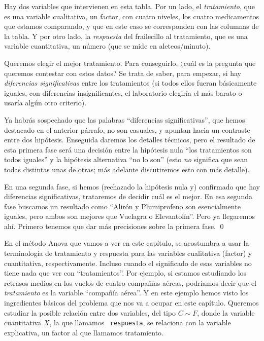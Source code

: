 \begin{ejemplo}
Hay dos variables que intervienen en esta tabla. Por un lado, el {\em tratamiento}, que es una
variable cualitativa, un factor, con cuatro niveles, los cuatro medicamentos que estamos
comparando, y que en este caso se corresponden con las columnas de la tabla. Y por otro lado, la
{\em respuesta} del frailecillo al tratamiento, que es una variable cuantitativa, un número (que se
mide en aleteos/minuto).

Queremos elegir el mejor tratamiento. Para conseguirlo,  ¿cuál es la pregunta que queremos
contestar con estos datos? Se trata de saber, para empezar, si hay {\em diferencias significativas}
entre los tratamientos (si todos ellos fueran básicamente iguales, con diferencias insignificantes,
el laboratorio elegiría el más barato o usaría algún otro criterio).

Ya habrás sospechado que las palabras ``diferencias significativas'', que hemos destacado en el
anterior párrafo, no son casuales, y apuntan hacia un contraste entre dos hipótesis. Enseguida
daremos los detalles técnicos, pero el resultado de esta primera fase será una decisión entre la
hipótesis nula ``los tratamientos son todos iguales'' y la hipótesis alternativa ``no lo son'' (esto {\em no} significa que sean todas distintas unas de otras; más adelante discutiremos esto con más detalle).

En una segunda fase, si hemos (rechazado la hipótesis nula y) confirmado que hay diferencias
significativas, trataremos de decidir cuál es el mejor. En esa segunda fase buscamos un resultado
como ``Alirón y Plumiprofeno son esencialmente iguales, pero ambos son mejores que Vuelagra o
Elevantolín''. Pero ya llegaremos ahí. Primero tenemos que dar más precisiones sobre la primera
fase. \qed
\end{ejemplo}


En el método Anova que vamos a ver en este capítulo, se acostumbra a usar la terminología de {\sf
tratamiento} y {\sf respuesta} para las variables cualitativa (factor) y cuantitativa, respectivamente. Incluso cuando el
significado de esas variables no tiene nada que ver con ``tratamientos''. Por ejemplo, si estamos
estudiando los retrasos medios en los vuelos de cuatro compañías aéreas, podríamos decir que el
{\em tratamiento} es la variable ``compañía aérea''. Y en este ejemplo hemos visto los ingredientes
básicos del problema que nos va a ocupar en este capítulo. Queremos estudiar la posible relación
entre dos variables, del tipo $C \sim F$, donde la variable cuantitativa $X$, la que llamamos {\tt
respuesta}, se relaciona con la variable explicativa, un factor al que llamamos {\sf tratamiento}.

